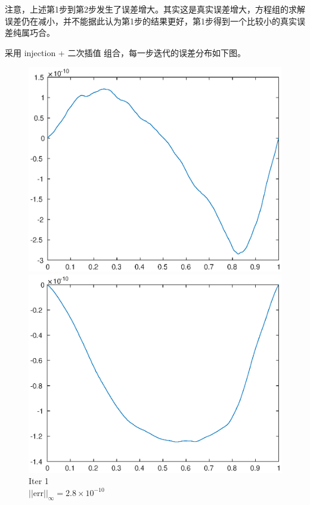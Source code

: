 \documentclass[lang=cn,10pt]{elegantbook}
\begin{document}
注意，上述第1步到第2步发生了误差增大。其实这是真实误差增大，方程组的求解误差仍在减小，并不能据此认为第1步的结果更好，第1步得到一个比较小的真实误差纯属巧合。

采用 injection + 二次插值 组合，每一步迭代的误差分布如下图。

\begin{figure}[H]
  \centering
  \begin{minipage}[t]{0.24\linewidth}
      \centering
      \includegraphics[width=0.9\linewidth]{figure/1-5-7.eps}
      \caption*{\small Iter 1 \\ $||\text{err}||_\infty=2.8\times 10^{-10}$}
  \end{minipage}
  \begin{minipage}[t]{0.24\linewidth}
    \centering
    \includegraphics[width=0.9\linewidth]{figure/1-5-8.eps}

\end{minipage}
\end{figure}
\end{document}
